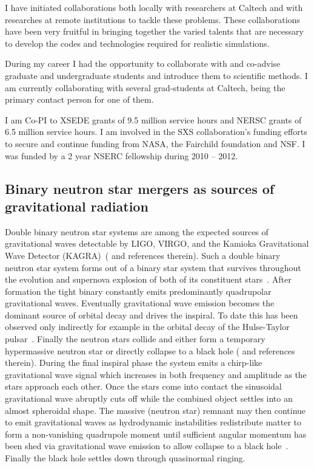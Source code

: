\documentclass[12pt]{article}
\newcommand{\ligo}{LIGO}
\newcommand{\virgo}{VIRGO}
\newcommand{\kagra}{KAGRA}
\begin{document}
I have initiated collaborations both locally with researchers at Caltech and
with researches at remote institutions to tackle these problems. These
collaborations have been very fruitful in bringing together the varied talents
that are necessary to develop the codes and technologies required for
realistic simulations. 

During my career I had the opportunity to collaborate with and co-advise
graduate and undergraduate students and introduce them to scientific methods.
I am currently collaborating with several grad-students at Caltech, being the
primary contact person for one of them.  

I am Co-PI to XSEDE grants of 9.5 million service hours and NERSC grants of
6.5 million service hours. I am involved in the SXS collaboration's funding
efforts to
secure and continue funding from NASA, the Fairchild foundation and NSF. I was
funded by a 2 year NSERC fellowship during 2010 -- 2012.

\subsection{Binary neutron star mergers as sources of gravitational radiation}
Double binary neutron star systems are among the expected sources of
gravitational waves detectable by
\ligo{}, \virgo{}, and the Kamioka Gravitational Wave Detector
(\kagra{})~(\cite{Anderson:2007km} and references therein).
Such a double binary neutron star system forms out of a binary
star system that
survives throughout the evolution and supernova explosion of both of its
constituent stars~\cite{Tauris:2003pf}. After formation the tight binary
constantly emits predominantly quadrupolar gravitational waves. Eventually
gravitational wave emission becomes the
dominant source of orbital decay and drives the inspiral. To date this has been
observed only indirectly for example 
in the orbital decay of the Hulse-Taylor pulsar~\cite{Hulse:1975}. 
Finally the neutron stars collide and either form
a temporary hypermassive neutron star or directly collapse to a black
hole (\cite{Faber:2012rw} and references therein). During the final inspiral
phase the system emits a
chirp-like gravitational wave signal which increases in both frequency and
amplitude as the stars approach each other. Once the stars come into
contact the sinusoidal gravitational wave abruptly cuts off 
while the combined object settles into an almost
spheroidal
shape. The massive (neutron star) remnant may then continue to emit
gravitational waves as hydrodynamic instabilities redistribute matter to form a
non-vanishing quadrupole moment until sufficient angular momentum has been
shed via gravitational wave emission to allow collapse to a black 
hole~\cite{Giacomazzo:2011cv}.  Finally the
black hole settles down through quasinormal ringing. 
\end{document}
